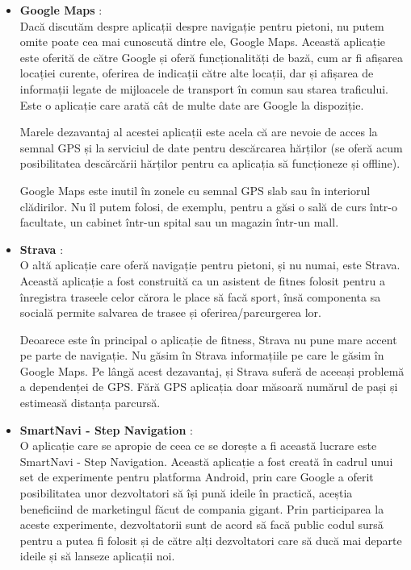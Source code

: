 \documentclass[12pt, a4paper, oneside]{article}
\begin{document}
\begin{itemize}  
\item \textbf{Google Maps} \cite{GoogleMaps}:\\
Dacă discutăm despre aplicații despre navigație pentru pietoni, nu putem omite poate cea mai cunoscută dintre ele, Google Maps. Această aplicație este oferită de către Google și oferă funcționalități de bază, cum ar fi afișarea locației curente, oferirea de indicații către alte locații, dar și afișarea de informații legate de mijloacele de transport în comun sau starea traficului. Este o aplicație care arată cât de multe date are Google la dispoziție. 

Marele dezavantaj al acestei aplicații este acela că are nevoie de acces la semnal GPS și la serviciul de date pentru descărcarea hărților (se oferă acum posibilitatea descărcării hărților pentru ca aplicația să funcționeze și offline).
 
Google Maps este inutil în zonele cu semnal GPS slab sau în interiorul clădirilor. Nu îl putem folosi, de exemplu, pentru a găsi o sală de curs într-o facultate, un cabinet într-un spital sau un magazin într-un mall. 
 
\item \textbf{Strava} \cite{Strava}:\\
O altă aplicație care oferă navigație pentru pietoni, și nu numai, este Strava. Această aplicație a fost construită ca un asistent de fitnes folosit pentru a înregistra traseele celor cărora le place să facă sport, însă componenta sa socială permite salvarea de trasee și oferirea/parcurgerea lor.

Deoarece este în principal o aplicație de fitness, Strava nu pune mare accent pe parte de navigație. Nu găsim în Strava informațiile pe care le găsim în Google Maps. Pe lângă acest dezavantaj, și Strava suferă de aceeași problemă a dependenței de GPS. Fără GPS aplicația doar măsoară numărul de pași și estimeasă distanța parcursă.

\item \textbf{SmartNavi - Step Navigation} \cite{SmartNavi}:\\
O aplicație care se apropie de ceea ce se dorește a fi această lucrare este SmartNavi - Step Navigation. Această aplicație a fost creată în cadrul unui set de experimente pentru platforma Android, prin care Google a oferit posibilitatea unor dezvoltatori să își pună ideile în practică, aceștia beneficiind de marketingul făcut de compania gigant. Prin participarea la aceste experimente, dezvoltatorii sunt de acord să facă public codul sursă pentru a putea fi folosit și de către alți dezvoltatori care să ducă mai departe ideile și să lanseze aplicații noi.


\end{itemize}
\end{document}
